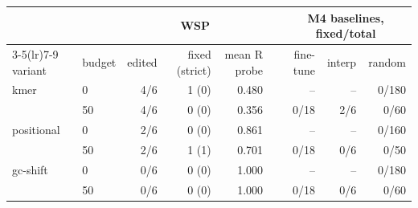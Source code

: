 \begin{tabular}{llrrrrrrr}
\toprule
& & \multicolumn{3}{c}{WSP} & & \multicolumn{3}{c}{M4 baselines, fixed/total} \\
\cmidrule(lr){3-5}\cmidrule(lr){7-9}
variant & budget & edited & fixed (strict) & mean R probe & & fine-tune & interp & random \\
\midrule
kmer & 0 & 4/6 & 1 (0) & 0.480 & & -- & -- & 0/180 \\
 & 50 & 4/6 & 0 (0) & 0.356 & & 0/18 & 2/6 & 0/60 \\
positional & 0 & 2/6 & 0 (0) & 0.861 & & -- & -- & 0/160 \\
 & 50 & 2/6 & 1 (1) & 0.701 & & 0/18 & 0/6 & 0/50 \\
gc-shift & 0 & 0/6 & 0 (0) & 1.000 & & -- & -- & 0/180 \\
 & 50 & 0/6 & 0 (0) & 1.000 & & 0/18 & 0/6 & 0/60 \\
\bottomrule
\end{tabular}
